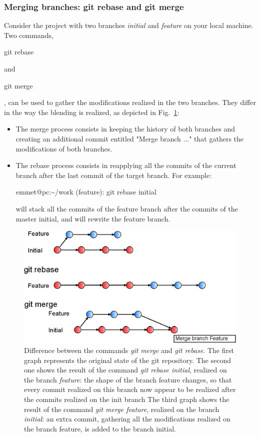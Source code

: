 \subsubsection{Merging branches: git rebase and git merge}

Consider the project with two branches \textit{initial} and \textit{feature} on your local machine.
Two commands, \begin{tt}git rebase\end{tt} and \begin{tt}git merge\end{tt}, can be used to gather the modifications realized in the two branches.
They differ in the way the blending is realized, as depicted in Fig.~\ref{fig:merge-rebase}:
\begin{itemize}
\item The merge process consists in keeping the history of both branches and creating an additional commit entitled "Merge branch ..." that gathers the modifications of both branches.
\item The rebase process consists in reapplying all the commits of the current branch after the last commit of the target branch. 
 For example:\\
\begin{tt}
emmet@pc:\textasciitilde/work (feature): git rebase initial\\
\end{tt}
will stack all the commits of the feature branch after the commits of the master initial, and will rewrite the feature branch.
\end{itemize}


\begin{figure}[htb]
\centering
\includegraphics[scale=1]{img/merge_rebase.eps}
\caption{Difference between the commands \textit{git merge} and \textit{git rebase}.
The first graph represents the original state of the git repository.
The second one shows the result of the command \textit{git rebase initial}, realized on the branch \textit{feature}: the shape of the branch feature changes, so that every commit realized on this branch now appear to be realized after the commits realized on the init branch
The third graph shows the result of the command \textit{git merge feature}, realized on the branch \textit{initial}: an extra commit, gathering all the modifications realized on the branch feature, is added to the branch initial.}
\label{fig:merge-rebase}
\end{figure}

